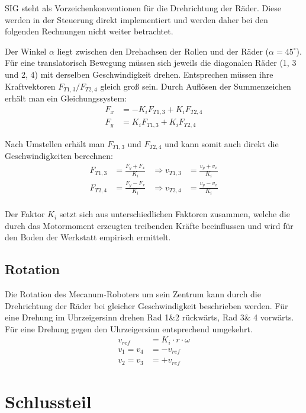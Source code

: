 \documentclass[a4paper]{article}
\begin{document}
SIG steht als Vorzeichenkonventionen für die Drehrichtung der Räder. Diese werden in der Steuerung direkt implementiert und werden daher bei den folgenden Rechnungen nicht weiter betrachtet.

Der Winkel $ \alpha $ liegt zwischen den Drehachsen der Rollen und der Räder ($\alpha = 45^\circ$).
Für eine translatorisch Bewegung müssen sich jeweils die diagonalen Räder (1, 3 und 2, 4) mit derselben Geschwindigkeit drehen. Entsprechen müssen ihre Kraftvektoren $F_{T1, 3} / F_{T2, 4}$ gleich groß sein.
Durch Auflösen der Summenzeichen erhält man ein Gleichungssystem:
\begin{align*}
F_x &= - K_i F_{T1, 3} + K_i F_{T2, 4} \\
F_y &= K_i F_{T1, 3}   + K_i F_{T2, 4}
\end{align*}

Nach Umstellen erhält man $F_{T1, 3}$ und $F_{T2, 4}$ und kann somit auch direkt die Geschwindigkeiten berechnen:
\begin{align*}
F_{T1, 3} &= \frac{F_y + F_x}{K_i} &\Rightarrow v_{T1, 3} &= \frac{v_y + v_x}{K_i}\\
F_{T2, 4} &= \frac{F_y - F_x}{K_i} &\Rightarrow v_{T2, 4} &= \frac{v_y - v_x}{K_i}\\
\end{align*}

Der Faktor $K_i$ setzt sich aus unterschiedlichen Faktoren zusammen, welche die durch das Motormoment erzeugten treibenden Kräfte beeinflussen und wird für den Boden der Werkstatt empirisch ermittelt.


\subsection{Rotation}
Die Rotation des Mecanum-Roboters um sein Zentrum kann durch die Drehrichtung der Räder bei gleicher Geschwindigkeit beschrieben werden.
Für eine Drehung im Uhrzeigersinn drehen Rad 1\&2 rückwärts, Rad 3\& 4 vorwärts. Für eine Drehung gegen den Uhrzeigersinn entsprechend umgekehrt.
\begin{align*}
v_{ref} &= K_i \cdot r \cdot \omega \\
v_1 = v_4 &= - v_{ref} \\
v_2 = v_3 &= + v_{ref}
\end{align*}



\section{Schlussteil}
\end{document}

